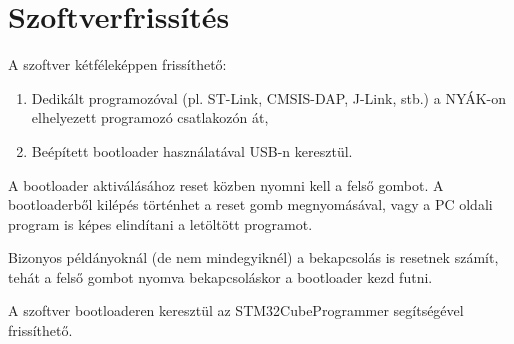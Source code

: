 \documentclass[12pt]{article}
\begin{document}
\section{Szoftverfrissítés}
A szoftver kétféleképpen frissíthető:
\begin{enumerate}
\item Dedikált programozóval (pl. ST-Link, CMSIS-DAP, J-Link, stb.) a NYÁK-on elhelyezett programozó csatlakozón át,
\item Beépített bootloader használatával USB-n keresztül.
\end{enumerate}

A bootloader aktiválásához reset közben nyomni kell a felső gombot. A bootloaderből kilépés történhet a reset gomb megnyomásával, vagy a PC oldali program is képes elindítani a letöltött programot.

\begin{remark}
Bizonyos példányoknál (de nem mindegyiknél) a bekapcsolás is resetnek számít, tehát a felső gombot nyomva bekapcsoláskor a bootloader kezd futni.
\end{remark}

A szoftver bootloaderen keresztül az STM32CubeProgrammer segítségével frissíthető.


\end{document}
